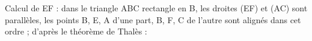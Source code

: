 \documentclass[10pt]{article}
\begin{document}
%
% 
% 
% 
%

Calcul de EF : dans le triangle ABC rectangle en B, les droites (EF) et (AC) sont parallèles, les points B, E, A d'une part, B, F, C de l'autre sont alignés dans cet ordre ; d'après le théorème de Thalès :
\end{document}
